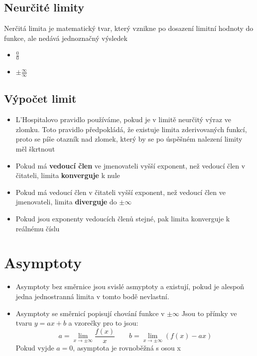 \documentclass[12pt]{article}
\begin{document}
\subsection*{Neurčité limity}
Nerčitá limita je matematický tvar, který vznikne po dosazení limitní hodnoty do funkce, ale nedává jednoznačný výsledek
\begin{itemize}
    \item $\frac{0}{0}$
    \item $\pm\frac{\infty}{\infty}$
\end{itemize}

\subsection*{Výpočet limit}
\begin{itemize}
    \item L'Hospitalovo pravidlo používáme, pokud je v limitě neurčitý výraz ve zlomku. Toto pravidlo předpokládá, že existuje limita zderivovaných funkcí, proto se píše otazník nad zlomek, který by se po úspěšném nalezení limity měl škrtnout
    \item Pokud má \textbf{vedoucí člen} ve jmenovateli vyšší exponent, než vedoucí člen v čitateli, limita \textbf{konverguje} k nule
    \item Pokud má vedoucí člen v čitateli vyšší exponent, než vedoucí člen ve jmenovateli, limita \textbf{diverguje} do $\pm \infty$
    \item Pokud jsou exponenty vedoucích členů stejné, pak limita konverguje k reálnému číslu
\end{itemize}

\section*{Asymptoty}
\begin{itemize}[itemsep = 2pt]
    \item Asymptoty bez směrnice jsou svislé asmyptoty a existují, pokud je alespoň jedna jednostranná limita v tomto bodě nevlastní.
    \item Asymptoty se směrnicí popisují chování funkce v $\pm\infty$ Jsou to přímky ve tvaru $y = ax + b$ a vzorečky pro to jsou:
    \[a = \lim_{x \to \pm\infty}\frac{f(x)}{x} \qquad b = \lim_{x \to \pm\infty}(f(x)-ax)\]
    Pokud vyjde $a = 0$, asymptota je rovnoběžná s osou x
\end{itemize}
\end{document}
